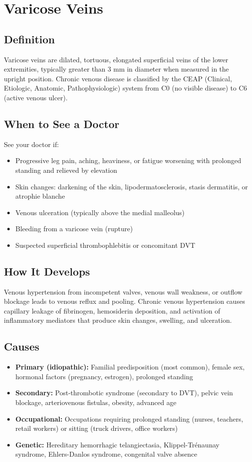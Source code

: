 \chapter{Varicose Veins}

\section*{Definition}
Varicose veins are dilated, tortuous, elongated superficial veins of the lower extremities, typically greater than 3 mm in diameter when measured in the upright position. Chronic venous disease is classified by the CEAP (Clinical, Etiologic, Anatomic, Pathophysiologic) system from C0 (no visible disease) to C6 (active venous ulcer).

\section*{When to See a Doctor}
See your doctor if:
\begin{itemize}
  \item Progressive leg pain, aching, heaviness, or fatigue worsening with prolonged standing and relieved by elevation
  \item Skin changes: darkening of the skin, lipodermatosclerosis, stasis dermatitis, or atrophie blanche
  \item Venous ulceration (typically above the medial malleolus)
  \item Bleeding from a varicose vein (rupture)
  \item Suspected superficial thrombophlebitis or concomitant DVT
\end{itemize}

\section*{How It Develops}
Venous hypertension from incompetent valves, venous wall weakness, or outflow blockage leads to venous reflux and pooling. Chronic venous hypertension causes capillary leakage of fibrinogen, hemosiderin deposition, and activation of inflammatory mediators that produce skin changes, swelling, and ulceration.

\section*{Causes}
\begin{itemize}
  \item \textbf{Primary (idiopathic):} Familial predisposition (most common), female sex, hormonal factors (pregnancy, estrogen), prolonged standing
  \item \textbf{Secondary:} Post-thrombotic syndrome (secondary to DVT), pelvic vein blockage, arteriovenous fistulas, obesity, advanced age
  \item \textbf{Occupational:} Occupations requiring prolonged standing (nurses, teachers, retail workers) or sitting (truck drivers, office workers)
  \item \textbf{Genetic:} Hereditary hemorrhagic telangiectasia, Klippel-Tr\'enaunay syndrome, Ehlers-Danlos syndrome, congenital valve absence
\end{itemize}

